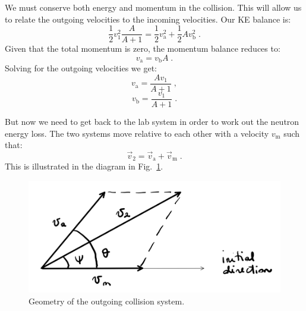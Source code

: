 We must conserve both energy and momentum in the collision. This will allow us to relate the outgoing velocities to the incoming velocities. Our KE balance is:
\begin{equation*}
    \frac{1}{2}v^2_1\frac{A}{A+1} = \frac{1}{2}v^2_\mathrm{a} + \frac{1}{2}Av^2_\mathrm{b}\;\mathrm{.}
\end{equation*}
Given that the total momentum is zero, the momentum balance reduces to:
\begin{equation*}
    v_\mathrm{a} = v_\mathrm{b}A\;\mathrm{.}
\end{equation*}
Solving for the outgoing velocities we get:
\begin{equation*}
    v_\mathrm{a} = \frac{A v_1}{A+1}\;\mathrm{,}
\end{equation*}
\begin{equation*}
    v_\mathrm{b} = \frac{v_1}{A+1}\;\mathrm{.}
\end{equation*}

But now we need to get back to the lab system in order to work out the neutron energy loss. The two systems move relative to each other with a velocity $v_\mathrm{m}$ such that:
\begin{equation*}
    \vec{v}_2 = \vec{v}_\mathrm{a} + \vec{v}_\mathrm{m}\;\mathrm{.}
\end{equation*}
This is illustrated in the diagram in Fig.~\ref{fig:system_transform}. 
\begin{figure}[h]
  \centering
  \includegraphics[scale=0.60]{./Figures/P1/outgoing.png} 
  \caption{Geometry of the outgoing collision system.} 
  \label{fig:system_transform}
\end{figure}

